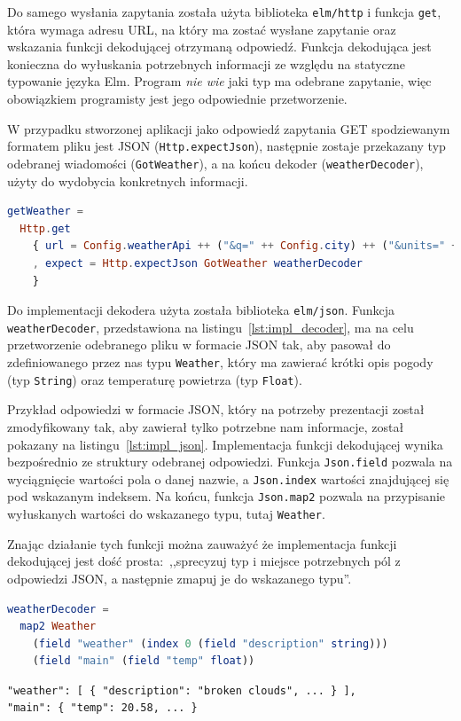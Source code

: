\documentclass[twoside,a4paper]{report}
\begin{document}
Do samego wysłania zapytania została użyta biblioteka \texttt{elm/http} i funkcja \texttt{get}, która wymaga adresu URL, na który ma zostać wysłane zapytanie oraz wskazania funkcji dekodującej otrzymaną odpowiedź.
Funkcja dekodująca jest konieczna do wyłuskania potrzebnych informacji ze względu na statyczne typowanie języka Elm.
Program \textit{nie wie} jaki typ ma odebrane zapytanie, więc obowiązkiem programisty jest jego odpowiednie przetworzenie.

W przypadku stworzonej aplikacji jako odpowiedź zapytania GET spodziewanym formatem pliku jest JSON (\texttt{Http.expectJson}), następnie zostaje przekazany typ odebranej wiadomości (\texttt{GotWeather}), a na końcu dekoder (\texttt{weatherDecoder}), użyty do wydobycia konkretnych informacji.
\begin{lstlisting}[mathescape,caption={Implementacja funkcji \texttt{getWeather}},label={lst:impl_weather},language={Elm}]
getWeather =
  Http.get
    { url = Config.weatherApi ++ ("&q=" ++ Config.city) ++ ("&units=" ++ Config.unit) ++ ("&appid=" ++ Config.apiKey)
    , expect = Http.expectJson GotWeather weatherDecoder
    }
\end{lstlisting}

Do implementacji dekodera użyta została biblioteka \texttt{elm/json}.
Funkcja \texttt{weatherDecoder}, przedstawiona na listingu~\ref{lst:impl_decoder}, ma na celu przetworzenie odebranego pliku w formacie JSON tak, aby pasował do zdefiniowanego przez nas typu \texttt{Weather}, który ma zawierać krótki opis pogody (typ \texttt{String}) oraz temperaturę powietrza (typ \texttt{Float}).

Przykład odpowiedzi w formacie JSON, który na potrzeby prezentacji został zmodyfikowany tak, aby zawierał tylko potrzebne nam informacje, został pokazany na listingu~\ref{lst:impl_json}.
Implementacja funkcji dekodującej wynika bezpośrednio ze struktury odebranej odpowiedzi.
Funkcja \texttt{Json.field} pozwala na wyciągnięcie wartości pola o danej nazwie, a \texttt{Json.index} wartości znajdującej się pod wskazanym indeksem.
Na końcu, funkcja \texttt{Json.map2} pozwala na przypisanie wyłuskanych wartości do wskazanego typu, tutaj \texttt{Weather}.

Znając działanie tych funkcji można zauważyć że implementacja funkcji dekodującej jest dość prosta:~,,sprecyzuj typ i miejsce potrzebnych pól z odpowiedzi JSON, a następnie zmapuj je do wskazanego typu''.

\begin{lstlisting}[mathescape,caption={Implementacja dekodera JSON},label={lst:impl_decoder},language={Elm}]
weatherDecoder =
  map2 Weather
    (field "weather" (index 0 (field "description" string)))
    (field "main" (field "temp" float))
\end{lstlisting}
\begin{lstlisting}[mathescape,caption={Odebrane zapytanie GET w formacie JSON},label={lst:impl_json}]
"weather": [ { "description": "broken clouds", ... } ],
"main": { "temp": 20.58, ... }
\end{lstlisting}
\end{document}
